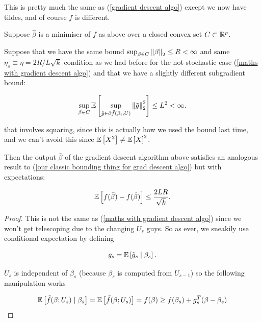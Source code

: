\documentclass[11pt]{scrartcl}
\begin{document}
\begin{remark}
This is pretty much the same as (\ref{gradient descent algo}) except we now have tildes, and of course $f$ is different.
\end{remark}

\begin{theorem}
Suppose $\hat{\beta}$ is a minimiser of $f$ as above over a closed convex set $C \subset \mathbb R^p$. 

Suppose that we have the same bound $\sup_{\beta \in C} \left\lVert\beta\right\rVert_2 \le R < \infty$ and same $\eta_s \equiv \eta = 2R / L\sqrt{k}$ condition as we had before for the not-stochastic case (\ref{maths with gradient descent algo}) and that we have a slightly different subgradient bound:

\begin{equation}
    \sup_{\beta \in C} \mathbb{E} \left[ \sup_{\tilde{g} \in \partial \tilde{f} (\beta_i; U)} \left\lVert\tilde{g}\right\rVert_2^2 \right] \le L^2 < \infty.
\end{equation}

that involves squaring, since this is actually how we used the bound last time, and we can't avoid this since $\mathbb{E} \left[ X^2 \right] \neq \mathbb{E} \left[ X \right]^2$.

Then the output $\bar{\beta}$ of the gradient descent algorithm above satisfies an analogous result to (\ref{our classic bounding thing for grad descent algo}) but with expectations:

\begin{equation}
    \mathbb{E} \left[ f(\bar{\beta}) - f(\hat{\beta}) \right] \le \frac{2LR}{\sqrt{k}}.
\end{equation}

\begin{proof}
This is not the same as (\ref{maths with gradient descent algo}) since we won't get telescoping due to the changing $U_s$ guys. So as ever, we sneakily use conditional expectation by defining

\begin{equation}
    g_s = \mathbb{E} \left[ \tilde{g}_s \mid \beta_s \right].
\end{equation}

$U_s$ is independent of $\beta_s$ (because $\beta_s$ is computed from $U_{s-1}$) so the following manipulation works

\begin{equation}
    \mathbb{E} \left[  \tilde{f}(\beta;U_s) \mid \beta_s  \right] = \mathbb{E} \left[ \tilde{f}(\beta;U_s) \right] = f(\beta) \ge f(\beta_s) + g_s^T (\beta - \beta_s)
\end{equation}


\end{proof}
\end{theorem}
\end{document}

